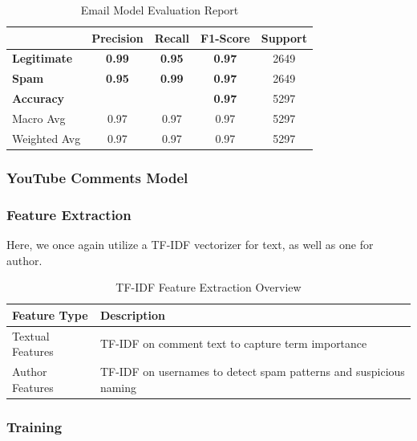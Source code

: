 \documentclass{article}
\begin{document}
\begin{table}[htbp]
    \centering
    \caption{Email Model Evaluation Report}
    \begin{tabular}{l c c c c}
    \toprule
     & \textbf{Precision} & \textbf{Recall} & \textbf{F1-Score} & Support \\
    \midrule
    \textbf{Legitimate} & \textbf{0.99} & \textbf{0.95} & \textbf{0.97} & 2649 \\
    \textbf{Spam} & \textbf{0.95} & \textbf{0.99} & \textbf{0.97} & 2649 \\
    \midrule
    \textbf{Accuracy}  & & & \textbf{0.97} & 5297 \\
    Macro Avg & 0.97 & 0.97 & 0.97 & 5297 \\
    Weighted Avg & 0.97 & 0.97 & 0.97 & 5297 \\
    \bottomrule
    \end{tabular}
    \label{tab:xgboost_evaluation}
\end{table}


\subsubsection{YouTube Comments Model}
\subsubsection*{Feature Extraction}

Here, we once again utilize a TF-IDF vectorizer for text, as well as one for author.

\begin{table}[H]
\renewcommand{\arraystretch}{1.3}
\setlength{\tabcolsep}{10pt}
\centering
\begin{tabular}{|p{5cm}|p{9cm}|}
\hline
\textbf{Feature Type} & \textbf{Description} \\
\hline
Textual Features & TF-IDF on comment text to capture term importance \\
\hline
Author Features & TF-IDF on usernames to detect spam patterns and suspicious naming \\
\hline
\end{tabular}
\caption{TF-IDF Feature Extraction Overview}
\label{tab:tfidf_features}
\end{table}

\subsubsection*{Training}
\end{document}
